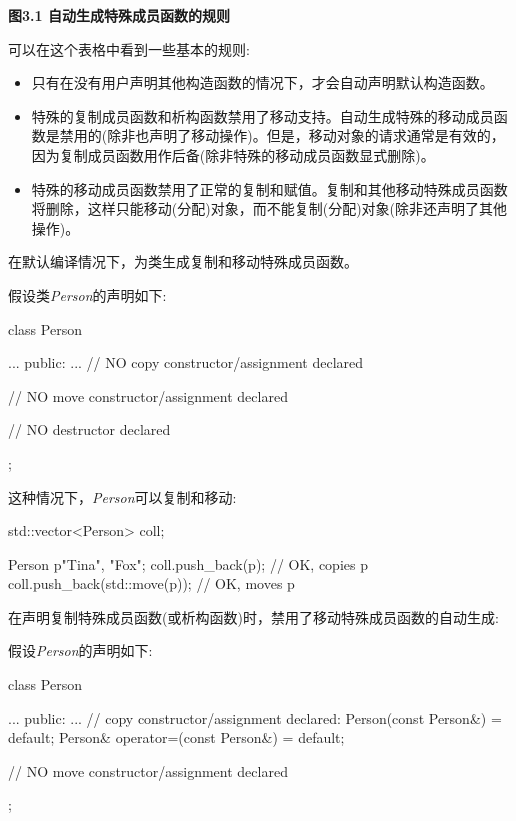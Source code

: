 \textbf{图3.1 自动生成特殊成员函数的规则}\par


可以在这个表格中看到一些基本的规则:\par

\begin{itemize}
  \item 只有在没有用户声明其他构造函数的情况下，才会自动声明默认构造函数。
  \item 特殊的复制成员函数和析构函数禁用了移动支持。自动生成特殊的移动成员函数是禁用的(除非也声明了移动操作)。但是，移动对象的请求通常是有效的，因为复制成员函数用作后备(除非特殊的移动成员函数显式删除)。
  \item 特殊的移动成员函数禁用了正常的复制和赋值。复制和其他移动特殊成员函数将删除，这样只能移动(分配)对象，而不能复制(分配)对象(除非还声明了其他操作)。
\end{itemize}


在默认编译情况下，为类生成复制和移动特殊成员函数。\par

假设类\textit{Person}的声明如下:\par

\begin{codebox}[cpp]
class Person {
  ...
public:
  ...
  // NO copy constructor/assignment declared

  // NO move constructor/assignment declared

  // NO destructor declared
};
\end{codebox}

这种情况下，\textit{Person}可以复制和移动:\par

\begin{codebox}[cpp]
std::vector<Person> coll;

Person p{"Tina", "Fox"};
coll.push_back(p); // OK, copies p
coll.push_back(std::move(p)); // OK, moves p
\end{codebox}


在声明复制特殊成员函数(或析构函数)时，禁用了移动特殊成员函数的自动生成:\par

假设\textit{Person}的声明如下:\par

\begin{codebox}[cpp]
class Person {
  ...
public:
  ...
  // copy constructor/assignment declared:
  Person(const Person&) = default;
  Person& operator=(const Person&) = default;

  // NO move constructor/assignment declared
};
\end{codebox}

